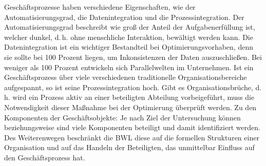 Geschäftsprozesse haben verschiedene Eigenschaften, wie der Automatisierungsgrad, die Datenintegration und die Prozessintegration. Der Automatisierungsgrad beschreibt wie groß der Anteil der Aufgabenerfüllung ist, welcher dunkel, d.\,h. ohne menschliche Interaktion, bewältigt werden kann. Die Datenintegration ist ein wichtiger Bestandteil bei Optimierungsvorhaben, denn sie sollte bei 100 Prozent liegen, um Inkonsistenzen der Daten auszuschließen. Bei weniger als 100 Prozent entwickeln sich Parallelwelten im Unternehmen. Ist ein Geschäftsprozess über viele verschiedenen traditionelle Organisationsbereiche aufgespannt, so ist seine Prozessintegration hoch. Gibt es Organisationsbrüche, d.\,h. wird ein Prozess aktiv an einer beteiligten Abteilung vorbeigeführt, muss die Notwendigkeit dieser Maßnahme bei der Optimierung überprüft werden. Zu den Komponenten der Geschäftsobjekte: Je nach Ziel der Untersuchung können beziehungsweise sind viele Komponenten beteiligt und damit identifiziert werden. Des Weiterenwegen beschränkt die \ac{BWL} diese auf die formellen Strukturen einer Organisation und auf das Handeln der Beteiligten, das unmittelbar Einfluss auf den Geschäftsprozess hat.\autocite[vgl.][S.\,15]{staud_geschaftsprozessanalyse_2006} \par

